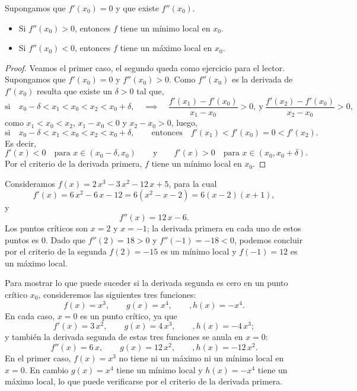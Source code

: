 \begin{proposition}
    Supongamos que $f'(x_0)=0$ y que existe $f''(x_0)$.
    \begin{itemize}
        \item Si $f''(x_0)>0$, entonces $f$ tiene un mínimo local en $x_0$.
        \item Si $f''(x_0)<0$, entonces $f$ tiene un máximo local en $x_0$.
    \end{itemize}
\end{proposition}

\begin{proof}
    Veamos el primer caso, el segundo queda como ejercicio para el lector.
    Supongamos que $f'(x_0)=0$ y $f''(x_0)>0$. Como $f''(x_0)$ es la derivada de $f'(x_0)$ resulta que existe un $\delta>0$ tal que, 
    $$ 
    \text{si}\quad x_0-\delta<x_1<x_0<x_2<x_0+\delta, 
    \quad\implies\quad 
    \frac{f'(x_1)- f'(x_0)}{x_1-x_0}>0,\ \text{y}\ 
    \frac{f'(x_2)- f'(x_0)}{x_2-x_0}>0,
    $$
    como $x_1<x_0<x_2$, $x_1-x_0<0$ y $x_2-x_0>0$, luego,
    $$ 
    \text{si}\quad x_0-\delta<x_1<x_0<x_2<x_0+\delta, 
    \qquad\text{entonces}\quad 
    f'(x_1)< f'(x_0) = 0 <f'(x_2).
    $$
    Es decir, 
    $$
    f'(x)<0\quad\text{para $x\in(x_0-\delta,x_0)$}
    \qquad\text{y}\qquad
    f'(x)>0\quad\text{para $x\in(x_0,x_0+\delta)$}.
    $$
    Por el criterio de la derivada primera, $f$ tiene un mínimo local en $x_0$.
\end{proof}

\begin{example}
    Consideramos $f(x)=2\, x^3-3\, x^2-12\, x+5$, para la cual
    $$ f'(x) = 6\, x^2 - 6\, x-12 = 6(x^2-x-2) = 6(x-2)(x+1),
    $$ 
    y $$ f''(x) = 12\, x-6.$$
    Los puntos críticos son $x=2$ y $x=-1$; la derivada primera en cada uno de estos puntos es $0$.
    Dado que $f''(2)=18>0$ y $f''(-1)=-18<0$, podemos concluir por el criterio de la segunda $f(2)=-15$ es un mínimo local y $f(-1)=12$ es un máximo local.
\end{example}

\begin{example}
    Para mostrar lo que puede suceder si la derivada segunda es cero en un punto crítico $x_0$, consideremos las siguientes tres funciones:
    $$ f(x)=x^3,\qquad g(x)=x^4,\qquad, h(x)=-x^4. $$
    En cada caso, $x=0$ es un punto crítico, ya que
    $$ f'(x)=3\, x^2,\qquad g(x)=4\, x^3,\qquad, h(x)=-4 \, x^3; $$
    y también la derivada segunda de estas tres funciones se anula en $x=0$:
    $$ f''(x)=6\, x,\qquad g(x)=12\, x^2,\qquad, h(x)=-12 \, x^2. $$
    En el primer caso, $f(x)=x^3$ no tiene ni un máximo ni un mínimo local en $x=0$. En cambio $g(x)=x^4$ tiene un mínimo local y $h(x)=-x^4$ tiene un máximo local, lo que puede verificarse por el criterio de la derivada primera.
    
\end{example}

